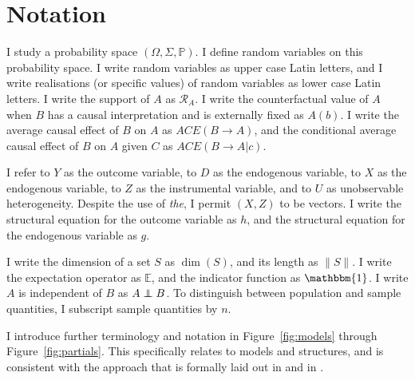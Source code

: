 \documentclass[10pt,a4paper,twoside]{article}
\newcommand\independent{\protect\mathpalette{\protect\independenT}{\perp}}
\def\independenT#1#2{\mathrel{\rlap{$#1#2$}\mkern2mu{#1#2}}}
\numberwithin{equation}{section}
\begin{document}
\section*{Notation}
I study a probability space $(\Omega,\Sigma,\mathbb{P})$. I define random variables on this probability space. I write random variables as upper case Latin letters, and I write realisations (or specific values) of random variables as lower case Latin letters. I write the support of $A$ as $\mathcal{R}_A$. I write the counterfactual value of $A$ when $B$ has a causal interpretation and is externally fixed as $A(b)$. I write the average causal effect of $B$ on $A$ as $ACE(B\rightarrow A)$, and the conditional average causal effect of $B$ on $A$ given $C$ as $ACE(B\rightarrow A|c)$.

I refer to $Y$ as the outcome variable, to $D$ as the endogenous variable, to $X$ as the endogenous variable, to $Z$ as the instrumental variable, and to $U$ as unobservable heterogeneity. Despite the use of \emph{the}, I permit $(X,Z)$ to be vectors. I write the structural equation for the outcome variable as $h$, and the structural equation for the endogenous variable as $g$.  

I write the dimension of a set $S$ as $\dim(S)$, and its length as $\| S\|$. I write the expectation operator as $\mathbb{E}$, and the indicator function as $\mathbbm{1}$. I write $A$ is independent of $B$ as $A\independent B$. To distinguish between population and sample quantities, I subscript sample quantities by $n$. 

I introduce further terminology and notation in Figure~\ref{fig:models} through Figure~\ref{fig:partials}. This specifically relates to models and structures, and is consistent with the approach that is formally laid out in \cite{h50} and in \cite{krE50}. 
\end{document}
